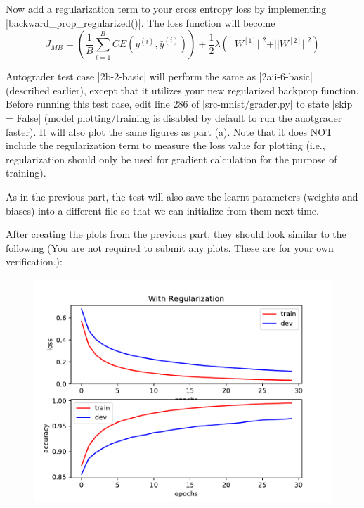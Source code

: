 \item {} Now add a regularization term to your cross entropy loss by implementing |backward_prop_regularized()|.
The loss function will become \begin{equation*}
  J_{MB} = \left(\frac{1}{B}\sum_{i=1}^{B}CE(y^{(i)}, \hat{y}^{(i)})\right) + \frac{1}{2} \lambda \left(\vert \vert W^{[1]}\vert \vert ^2 + \vert \vert W^{[2]}\vert \vert ^2 \right)
  \end{equation*}

Autograder test case |2b-2-basic| will perform the same as |2aii-6-basic| (described earlier), except that it utilizes your new regularized backprop function.  Before running this test case, edit line 286 of |src-mnist/grader.py| to state |skip = False| (model plotting/training is disabled by default to run the auotgrader faster).  It will also plot the same
figures as part (a). Note that it does NOT include the regularization term to measure
the loss value for plotting (i.e., regularization should only be used for gradient calculation for
the purpose of training).

As in the previous part, the test will also save the learnt parameters (weights and biases) into a
different file so that we can initialize from them next time.

\clearpage\newpage
After creating the plots from the previous part, they should look similar to the following (You are not required to submit any plots.  These are for your own verification.):

\begin{figure}[H]
    \centering
    \includegraphics[scale=0.75]{02-mnist/regularized.pdf}
\end{figure}